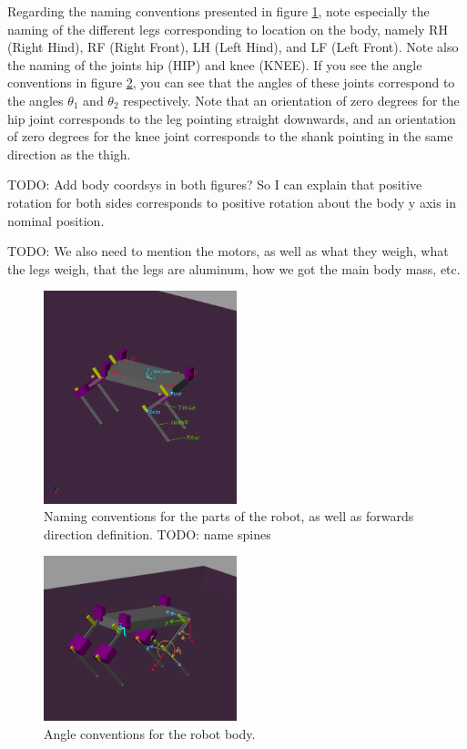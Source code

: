 Regarding the naming conventions presented in figure \ref{fig:name_conventions}, note especially the naming of the different legs corresponding to location on the body, namely RH (Right Hind), RF (Right Front), LH (Left Hind), and LF (Left Front). Note also the naming of the joints hip (HIP) and knee (KNEE). If you see the angle conventions in figure \ref{fig:angle_conventions}, you can see that the angles of these joints correspond to the angles $\theta_1$ and $\theta_2$ respectively. Note that an orientation of zero degrees for the hip joint corresponds to the leg pointing straight downwards, and an orientation of zero degrees for the knee joint corresponds to the shank pointing in the same direction as the thigh. 

TODO: Add body coordsys in both figures? So I can explain that positive rotation for both sides corresponds to positive rotation about the body y axis in nominal position. 

TODO: We also need to mention the motors, as well as what they weigh, what the legs weigh, that the legs are aluminum, how we got the main body mass, etc. 

\begin{figure}
    \centering
    \includegraphics[width=0.5\textwidth]{Images/name_conventions.png}
    \caption{Naming conventions for the parts of the robot, as well as forwards direction definition. TODO: name spines}
    \label{fig:name_conventions}
\end{figure}

\begin{figure}
    \centering
    \includegraphics[width=0.5\textwidth]{Images/angle_conventions.png}
    \caption{Angle conventions for the robot body.}
    \label{fig:angle_conventions}
\end{figure}

